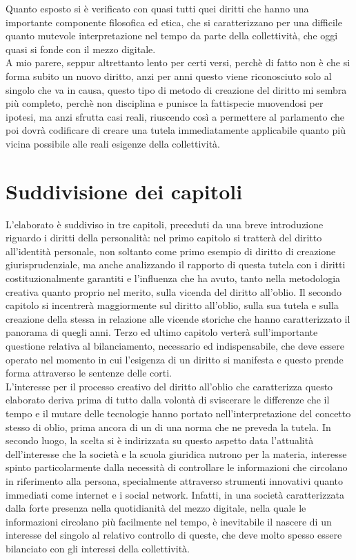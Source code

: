 Quanto esposto si è verificato con quasi tutti quei diritti che hanno una importante componente filosofica ed etica, che si caratterizzano per una difficile quanto mutevole interpretazione nel tempo da parte della collettività, che oggi quasi si fonde con il mezzo digitale.
\\A mio parere, seppur altrettanto lento per certi versi, perchè di fatto non è che si forma subito un nuovo diritto, anzi per anni questo viene riconosciuto solo al singolo che va in causa, questo tipo di metodo di creazione del diritto mi sembra più completo, perchè non disciplina e punisce la fattispecie muovendosi per ipotesi, ma anzi sfrutta casi reali, riuscendo così a permettere al parlamento che poi dovrà codificare di creare una tutela immediatamente applicabile quanto più vicina possibile alle reali esigenze della collettività.
\section{Suddivisione dei capitoli}%
L'elaborato è suddiviso in tre capitoli, preceduti da una breve introduzione riguardo i diritti della personalità: nel primo capitolo si tratterà del diritto all'identità personale, non soltanto come primo esempio di diritto di creazione giurisprudenziale, ma anche analizzando il rapporto di questa tutela con i diritti costituzionalmente garantiti e l'influenza che ha avuto, tanto nella metodologia creativa quanto proprio nel merito, sulla vicenda del diritto all'oblio.
Il secondo capitolo si incentrerà maggiormente sul diritto all'oblio, sulla sua tutela e sulla creazione della stessa in relazione alle vicende storiche che hanno caratterizzato il panorama di quegli anni.
Terzo ed ultimo capitolo verterà sull'importante questione relativa al bilanciamento, necessario ed indispensabile, che deve essere operato nel momento in cui l'esigenza di un diritto si manifesta e questo prende forma attraverso le sentenze delle corti.
\\ L'interesse per il processo creativo del diritto all'oblio che caratterizza questo elaborato deriva prima di tutto dalla volontà di sviscerare le differenze che il tempo e il mutare delle tecnologie hanno portato nell'interpretazione del concetto stesso di oblio, prima ancora di un di una norma che ne preveda la tutela.
In secondo luogo, la scelta si è indirizzata su questo aspetto data l'attualità dell'interesse che la società e la scuola giuridica nutrono per la materia, interesse spinto particolarmente dalla necessità di controllare le informazioni che circolano in riferimento alla persona, specialmente attraverso strumenti innovativi quanto immediati come internet e i social network.
Infatti, in una società caratterizzata dalla forte presenza nella quotidianità del mezzo digitale, nella quale le informazioni circolano più facilmente nel tempo, è inevitabile il nascere di un interesse del singolo al relativo controllo di queste, che deve molto spesso essere bilanciato con gli interessi della collettività.

